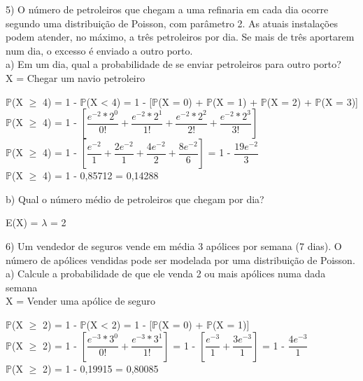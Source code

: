 \documentclass[12pt,a4paper]{article}
\begin{document}
	\vspace{1cm}
	5) O número de petroleiros que chegam a uma refinaria em cada dia ocorre segundo uma distribuição de Poisson, com parâmetro 2. As atuais instalações podem atender, no máximo, a três petroleiros por dia. Se mais de três aportarem num dia, o excesso é enviado a outro porto.\\
	a) Em um dia, qual a probabilidade de se enviar petroleiros para outro porto?
	\vspace{0.5cm}\\
	X = Chegar um navio petroleiro
	\begin{center}
		\vspace{0.5cm}
		$\mathbb{P}$(X $\geq$ 4) = 1 - $\mathbb{P}$(X < 4) = 1 - [$\mathbb{P}$(X = 0) + $\mathbb{P}$(X = 1) + $\mathbb{P}$(X = 2) + $\mathbb{P}$(X = 3)]
		\vspace{0.5cm}\\
		$\mathbb{P}$(X $\geq$ 4) = 1 - $\left[\dfrac{e^{-2} * 2^0}{0!} + \dfrac{e^{-2} * 2^1}{1!} + \dfrac{e^{-2} * 2^2}{2!} + \dfrac{e^{-2} * 2^3}{3!}\right]$
		\vspace{0.5cm}\\
		$\mathbb{P}$(X $\geq$ 4) = 1 - $\left[\dfrac{e^{-2}}{1} + \dfrac{2e^{-2}}{1} + \dfrac{4e^{-2}}{2} + \dfrac{8e^{-2}}{6}\right]$ = 1 - $\dfrac{19e^{-2}}{3}$
		\vspace{0.5cm}\\
		$\mathbb{P}$(X $\geq$ 4) = 1 - 0,85712 = 0,14288
	\end{center}
	\vspace{1cm}
	b) Qual o número médio de petroleiros que chegam por dia?
	\vspace{0.5cm}\\
	\begin{center}
		E(X) = $\lambda$ = 2
	\end{center}
	\vspace{1cm}
	6) Um vendedor de seguros vende em média 3 apólices por semana (7 dias). O número de	apólices vendidas pode ser modelada por uma distribuição de Poisson.\\
	a) Calcule a probabilidade de que ele venda 2 ou mais apólices numa dada semana
	\vspace{0.5cm}\\
	X = Vender uma apólice de seguro
	\begin{center}
		\vspace{0.5cm}
		$\mathbb{P}$(X $\geq$ 2) = 1 - $\mathbb{P}$(X < 2) = 1 - [$\mathbb{P}$(X = 0) + $\mathbb{P}$(X = 1)]
		\vspace{0.5cm}\\
		$\mathbb{P}$(X $\geq$ 2) = 1 - $\left[\dfrac{e^{-3} * 3^0}{0!} + \dfrac{e^{-3} * 3^1}{1!}\right]$ = 1 - $\left[\dfrac{e^{-3}}{1} + \dfrac{3e^{-3}}{1}\right]$ = 1 - $\dfrac{4e^{-3}}{1}$
		\vspace{0.5cm}\\
		$\mathbb{P}$(X $\geq$ 2) = 1 - 0,19915 = 0,80085
	\end{center}
\end{document}
